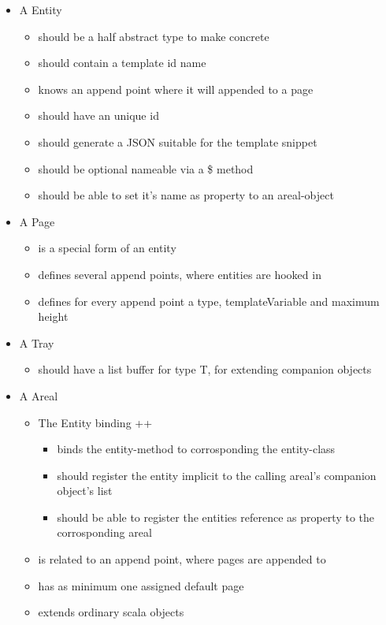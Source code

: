 \begin{itemize}
  \item A Entity
  \begin{itemize}
    \item should be a half abstract type to make concrete
    \item should contain a template id name
    \item knows an append point where it will appended to a page
    \item should have an unique id
    \item should generate a JSON suitable for the template snippet
    \item should be optional nameable via a \$ method
    \item should be able to set it's name as property to an areal-object
  \end{itemize}
  \item A Page 
  \begin{itemize}
    \item is a special form of an entity
    \item defines several append points, where entities are hooked in
    \item defines for every append point a type, templateVariable and maximum height
  \end{itemize}
  \item A Tray 
  \begin{itemize}
    \item should have a list buffer for type T, for extending companion objects
  \end{itemize}
  \item A Areal 
  \begin{itemize}
    \item The Entity binding ++ 
    \begin{itemize}
      \item binds the entity-method to corrosponding the entity-class
      \item should register the entity implicit to the calling areal's companion object's list
      \item should be able to register the entities reference as property to the corrosponding areal
      \end{itemize}
    \item is related to an append point, where pages are appended to
    \item has as minimum one assigned default page
    \item extends ordinary scala objects

\end{itemize}
\end{itemize}
